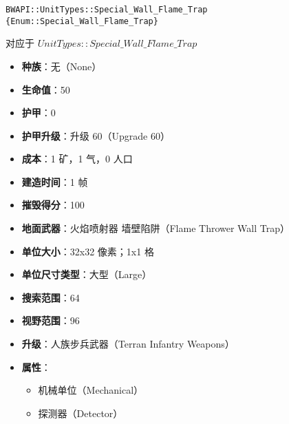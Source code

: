 \begin{tcolorbox}[colback=white, colframe=black!60!white, title=Special\_Wall\_Flame\_Trap(), arc=0mm]
    \begin{verbatim}
BWAPI::UnitTypes::Special_Wall_Flame_Trap {Enum::Special_Wall_Flame_Trap}
    \end{verbatim}
    对应于  $UnitTypes::Special\_Wall\_Flame\_Trap$ 
    \begin{itemize}
        \item \textbf{种族}：无（None）
        \item \textbf{生命值}：50
        \item \textbf{护甲}：0
        \item \textbf{护甲升级}：升级 60（Upgrade 60）
        \item \textbf{成本}：1 矿，1 气，0 人口
        \item \textbf{建造时间}：1 帧
        \item \textbf{摧毁得分}：100
        \item \textbf{地面武器}：火焰喷射器 墙壁陷阱（Flame Thrower Wall Trap）
        \item \textbf{单位大小}：32x32 像素；1x1 格
        \item \textbf{单位尺寸类型}：大型（Large）
        \item \textbf{搜索范围}：64
        \item \textbf{视野范围}：96
        \item \textbf{升级}：人族步兵武器（Terran Infantry Weapons）
        \item \textbf{属性}：
            \begin{itemize}
                \item 机械单位（Mechanical）
                \item 探测器（Detector）
            \end{itemize}
    \end{itemize}
\end{tcolorbox}

